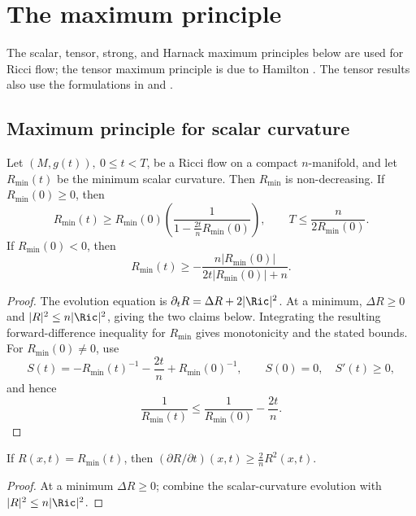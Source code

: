 \chapter{The maximum principle}
\label{chap:maximum-principle}
\label{secmaxprin}

The scalar, tensor, strong, and Harnack maximum principles below are used
for Ricci flow; the tensor maximum principle is due to Hamilton
\cite{Hamilton4MPIC}. The tensor results also use the formulations in
\cite{Hamilton4MPCO} and \cite{ChowKnopf}.

\section{Maximum principle for scalar curvature}

\begin{proposition}
\label{prop:scalar-curvature-min-evolution}
\label{scalarevol}
Let $(M,g(t)),\ 0\le t<T$, be a Ricci flow on a compact
$n$-manifold, and let $R_\mathrm{min}(t)$ be the minimum scalar curvature.
Then $R_\mathrm{min}$ is non-decreasing. If $R_\mathrm{min}(0)\ge0$, then
\[
R_\mathrm{min}(t)\ge R_\mathrm{min}(0)\left(\frac{1}{1-\frac{2t}{n}R_\mathrm{min}(0)}\right),
\qquad T\le\frac{n}{2R_\mathrm{min}(0)}.
\]
If $R_\mathrm{min}(0)<0$, then
\[
R_\mathrm{min}(t)\ge-\frac{n|R_\mathrm{min}(0)|}{2t|R_\mathrm{min}(0)|+n}.
\]
\end{proposition}
\begin{proof}

\sketch The evolution equation is $\partial_tR=\Delta R+2|\Ric|^2$.
At a minimum, $\Delta R\ge0$ and $|R|^2\le n|\Ric|^2$, giving
the two claims below. Integrating the resulting forward-difference inequality
for $R_\mathrm{min}$ gives monotonicity and the stated bounds. For
$R_\mathrm{min}(0)\ne0$, use
\[
S(t)=-R_\mathrm{min}(t)^{-1}-\frac{2t}{n}+R_\mathrm{min}(0)^{-1},
\qquad S(0)=0,\quad S'(t)\ge0,
\]
and hence
\begin{equation}\label{Rminineq}
\frac{1}{R_\mathrm{min}(t)}\le\frac{1}{R_\mathrm{min}(0)}-\frac{2t}{n}.
\end{equation}
\end{proof}

\begin{claim}
\label{claim:scalar-min-derivative-bound}
\label{firstclaim}
If $R(x,t)=R_\mathrm{min}(t)$, then
$(\partial R/\partial t)(x,t)\ge\frac{2}{n}R^2(x,t)$.
\end{claim}
\begin{proof}
\sketch At a minimum $\Delta R\ge0$; combine the scalar-curvature evolution
with $|R|^2\le n|\Ric|^2$.
\end{proof}

